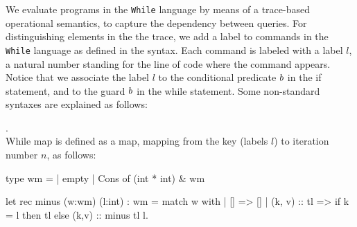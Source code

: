 \documentclass[a4paper,11pt]{article}
\begin{document}
{
We evaluate programs in the {\tt While} language by means of a trace-based operational semantics, to capture the dependency between queries. For distinguishing elements in the the trace, we add a label to commands in the {\tt While} language as defined in the syntax.
%
Each command is labeled with a label $l$, a natural number standing for the line of code where the command appears. Notice that we associate the label $l$ to the conditional predicate $b$ in the if statement, and to the guard $b$ in the while statement. Some non-standard syntaxes are explained as follows:  
%
  	\begin{defn}.
  	\\
  	While map is defined as a map, mapping from the key (labels $l$) to iteration number $n$, as follows:
	\begin{ocaml}{}
	type wm = | empty 
	          | Cons of (int * int) & wm

	let rec  minus (w:wm) (l:int) : wm = 
	    match w with 
	       | [] => []
	       | (k, v) :: tl => 
	        if k = l then tl else (k,v) :: minus tl l.   


\end{ocaml}
\end{defn}}
\end{document}
